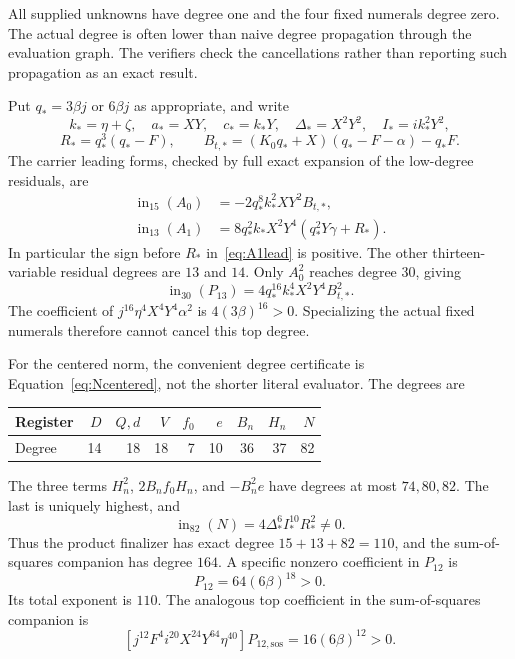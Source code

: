\documentclass[11pt]{article}
\newcommand{\ini}{\operatorname{in}}
\theoremstyle{remark}
\begin{document}
All supplied unknowns have degree one and the four fixed numerals degree
zero. The actual degree is often lower than naive degree propagation
through the evaluation graph. The verifiers check the cancellations rather
than reporting such propagation as an exact result.

Put $q_*=3\beta j$ or $6\beta j$ as appropriate, and write
\[
 k_*=\eta+\zeta,\quad a_*=XY,\quad c_*=k_*Y,
 \quad\Delta_*=X^2Y^2,\quad I_*=ik_*^2Y^2,
\]
\[
 R_*=q_*^3(q_*-F),\qquad
 B_{t,*}=(K_0q_*+X)(q_*-F-\alpha)-q_*F.
\]
The carrier leading forms, checked by full exact expansion of the
low-degree residuals, are
\begin{align}
 \ini_{15}(A_0)&=-2q_*^8k_*^2XY^2B_{t,*},\label{eq:A0lead}\\
 \ini_{13}(A_1)&=8q_*^2k_*X^2Y^4(q_*^2Y\gamma+R_*).
 \label{eq:A1lead}
\end{align}
In particular the sign before $R_*$ in~\eqref{eq:A1lead} is positive.
The other thirteen-variable residual degrees are $13$ and $14$.
Only $A_0^2$ reaches degree $30$, giving
\[
 \ini_{30}(P_{13})=4q_*^{16}k_*^4X^2Y^4B_{t,*}^2.
\]
The coefficient of $j^{16}\eta^4X^4Y^4\alpha^2$ is
$4(3\beta)^{16}>0$. Specializing the actual fixed numerals therefore
cannot cancel this top degree.

For the centered norm, the convenient degree certificate is
Equation~\eqref{eq:Ncentered}, not the shorter literal evaluator.
The degrees are
\begin{center}
\begin{tabular}{@{}lrrrrrrrr@{}}
\toprule
Register & $D$ & $Q,d$ & $V$ & $f_0$ & $e$ & $B_n$ & $H_n$ & $N$\\
\midrule
Degree & 14 & 18 & 18 & 7 & 10 & 36 & 37 & 82\\
\bottomrule
\end{tabular}
\end{center}
The three terms $H_n^2$, $2B_nf_0H_n$, and $-B_n^2e$ have degrees at
most $74,80,82$. The last is uniquely highest, and
\begin{equation}
 \ini_{82}(N)=4\Delta_*^6I_*^{10}R_*^2\ne0.
 \label{eq:Nlead}
\end{equation}
Thus the product finalizer has exact degree $15+13+82=110$, and the
sum-of-squares companion has degree $164$. A specific nonzero coefficient
in $P_{12}$ is
\begin{equation}
 [j^{18}F^2\alpha\gamma i^{10}X^{16}Y^{39}\eta^{23}]P_{12}
       =64(6\beta)^{18}>0.
 \label{eq:degreewitness}
\end{equation}
Its total exponent is $110$. The analogous top coefficient in the
sum-of-squares companion is
\[
 [j^{12}F^4i^{20}X^{24}Y^{64}\eta^{40}]P_{12,\mathrm{sos}}
       =16(6\beta)^{12}>0.
\]
\end{document}
